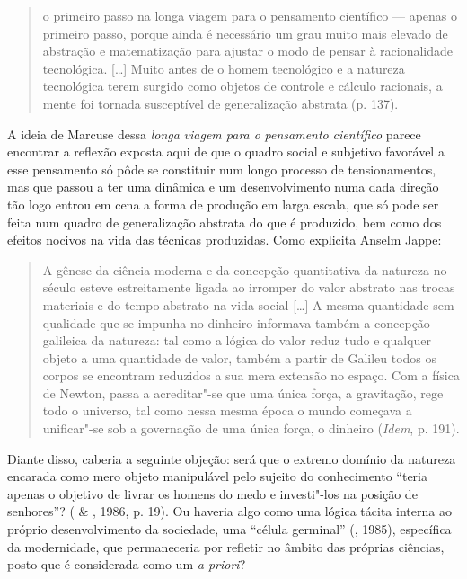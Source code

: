 \begin{quote}
o primeiro passo na longa viagem para o pensamento científico --- apenas
o primeiro passo, porque ainda é necessário um grau muito mais elevado
de abstração e matematização para ajustar o modo de pensar à
racionalidade tecnológica. [\ldots{}] Muito antes de o homem tecnológico
e a natureza tecnológica terem surgido como objetos de controle e
cálculo racionais, a mente foi tornada susceptível de generalização
abstrata (p. 137).
\end{quote}

A ideia de Marcuse dessa \emph{longa} \emph{viagem para o}
\emph{pensamento} \emph{científico} parece encontrar a reflexão exposta aqui
de que o quadro social e subjetivo favorável a esse pensamento
só pôde se constituir num longo processo de tensionamentos, mas que
passou a ter uma dinâmica e um desenvolvimento numa dada direção tão
logo entrou em cena a forma de produção em larga escala, que só pode ser
feita num quadro de generalização abstrata do que é produzido, bem como
dos efeitos nocivos na vida das técnicas produzidas. Como explicita
Anselm Jappe:

\begin{quote}
A gênese da ciência moderna e da concepção quantitativa da natureza no
século  esteve estreitamente ligada ao irromper do valor abstrato
nas trocas materiais e do tempo abstrato na vida social [\ldots{}] A
mesma quantidade sem qualidade que se impunha no dinheiro informava
também a concepção galileica da natureza: tal como a lógica do valor
reduz tudo e qualquer objeto a uma quantidade de valor, também a partir
de Galileu todos os corpos se encontram reduzidos a sua mera extensão no
espaço. Com a física de Newton, passa a acreditar"-se que uma única
força, a gravitação, rege todo o universo, tal como nessa mesma época o
mundo começava a unificar"-se sob a governação de uma única força, o
dinheiro (\emph{Idem}, p. 191).
\end{quote}

Diante disso, caberia a seguinte objeção: será que o extremo domínio da
natureza encarada como mero objeto manipulável pelo sujeito do
conhecimento ``teria apenas o objetivo de livrar os homens do medo e
investi"-los na posição de senhores''? ( \& , 1986, p.
19). Ou haveria algo como uma lógica tácita interna ao próprio
desenvolvimento da sociedade, uma ``célula germinal'' (, 1985),
específica da modernidade, que permaneceria por refletir no âmbito das
próprias ciências, posto que é considerada como um \emph{a priori}?


